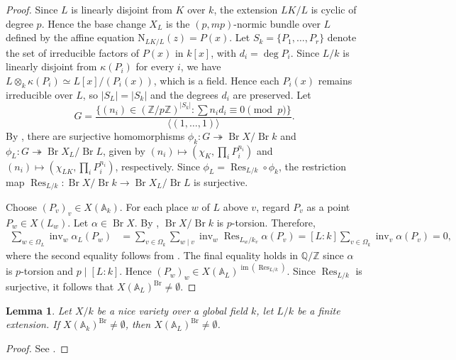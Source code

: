 \documentclass[10pt]{amsart}
\theoremstyle{plain}
\newtheorem{lemma}[thm]{Lemma}
\theoremstyle{definition}
\newcommand{\A}{{\mathbb A}}
\newcommand{\Q}{{\mathbb Q}}
\newcommand{\Z}{{\mathbb Z}}
\newcommand{\Nm}{\mathrm{N}}
\newcommand{\Br}{\operatorname{Br}}
\newcommand{\res}{\operatorname{Res}}
\newcommand{\inv}{\operatorname{inv}}
\begin{document}
\begin{proof}
Since \(L\) is linearly disjoint from \(K\) over \(k\), the extension \(LK/L\) is cyclic of degree \(p\). Hence the base change \(X_L\) is the \((p,mp)\)-normic bundle over \(L\) defined by the affine equation \(\Nm_{LK/L}(z)=P(x)\). Let $S_k=\{P_1,\dots,P_r\}$ denote the set of irreducible factors of $P(x)$ in $k[x]$, with $d_i=\deg P_i$. Since $L/k$ is linearly disjoint from $\kappa(P_i)$ for every $i$, we have $L\otimes_k\kappa(P_i)\simeq L[x]/(P_i(x))$, which is a field. Hence each $P_i(x)$ remains irreducible over $L$, so $|S_L|=|S_k|$ and the degrees $d_i$ are preserved. Let
$$
G=\frac{\{(n_i)\in(\mathbb Z/p\mathbb Z)^{|S_k|}:\sum n_i d_i\equiv0\pmod p\}}{\langle(1,\dots,1)\rangle}.
$$
By \cite[Theorem~3.2]{AVB}, there are surjective homomorphisms $\phi_k:G\twoheadrightarrow\Br X/\Br k$ and $\phi_L:G\twoheadrightarrow\Br X_L/\Br L$, given by $(n_i)\mapsto(\chi_K,\prod_iP_i^{n_i})$ and $(n_i)\mapsto(\chi_{LK},\prod_iP_i^{n_i})$, respectively. Since $\phi_L=\res_{L/k}\circ\phi_k$, the restriction map $\res_{L/k}:\Br X/\Br k\to\Br X_L/\Br L$ is surjective.

Choose $(P_v)_v\in X(\A_k)$. For each place $w$ of $L$ above $v$, regard $P_v$ as a point $P_w\in X(L_w)$. Let $\alpha\in\Br X$. By \cite[Theorem~3.2]{AVB}, $\Br X/\Br k$ is $p$-torsion. Therefore,  
$$
\begin{aligned}
\sum_{w\in\Omega_L}\inv_w\alpha_L(P_w)
&=\sum_{v\in\Omega_k}\sum_{w\mid v}\inv_w\res_{L_w/k_v}\alpha(P_v)=[L:k]\sum_{v\in\Omega_k}\inv_v\alpha(P_v)=0,
\end{aligned}
$$
where the second equality follows from \cite[Theorem~1.5.34]{Poo}. The final equality holds in \(\Q/\Z\) since \(\alpha\) is \(p\)-torsion and \(p\mid[L:k]\). Hence $(P_w)_w\in X(\A_L)^{\operatorname{im}(\res_{L/k})}$. Since $\res_{L/k}$ is surjective, it follows that $X(\A_L)^{\Br}\neq\emptyset$.
\end{proof}

\begin{lemma}\label{points below to points above}
Let $X/k$ be a nice variety over a global field $k$, let $L/k$ be a finite extension. If $X(\A_k)^{\Br}\neq\emptyset$, then $X(\A_L)^{\Br}\neq\emptyset$.
\end{lemma}

\begin{proof}
See \cite[Lemma 3.1]{CV}.
\end{proof}

\end{document}
